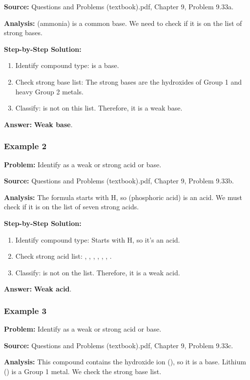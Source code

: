 \documentclass{article}
\begin{document}
\textbf{Source:} Questions and Problems (textbook).pdf, Chapter 9, Problem 9.33a.

\textbf{Analysis:}  (ammonia) is a common base. We need to check if it is on the list of strong bases.

\textbf{Step-by-Step Solution:}
\begin{enumerate}
    \item Identify compound type:  is a base.
    \item Check strong base list: The strong bases are the hydroxides of Group 1 and heavy Group 2 metals.
    \item Classify:  is not on this list. Therefore, it is a weak base.
\end{enumerate}

\textbf{Answer:} \textbf{Weak base}.

\subsubsection{Example 2}
\textbf{Problem:} Identify  as a weak or strong acid or base.

\textbf{Source:} Questions and Problems (textbook).pdf, Chapter 9, Problem 9.33b.

\textbf{Analysis:} The formula starts with H, so  (phosphoric acid) is an acid. We must check if it is on the list of seven strong acids.

\textbf{Step-by-Step Solution:}
\begin{enumerate}
    \item Identify compound type: Starts with H, so it's an acid.
    \item Check strong acid list: , , , , , , .
    \item Classify:  is not on the list. Therefore, it is a weak acid.
\end{enumerate}

\textbf{Answer:} \textbf{Weak acid}.

\subsubsection{Example 3}
\textbf{Problem:} Identify  as a weak or strong acid or base.

\textbf{Source:} Questions and Problems (textbook).pdf, Chapter 9, Problem 9.33c.

\textbf{Analysis:} This compound contains the hydroxide ion (), so it is a base. Lithium () is a Group 1 metal. We check the strong base list.
\end{document}
